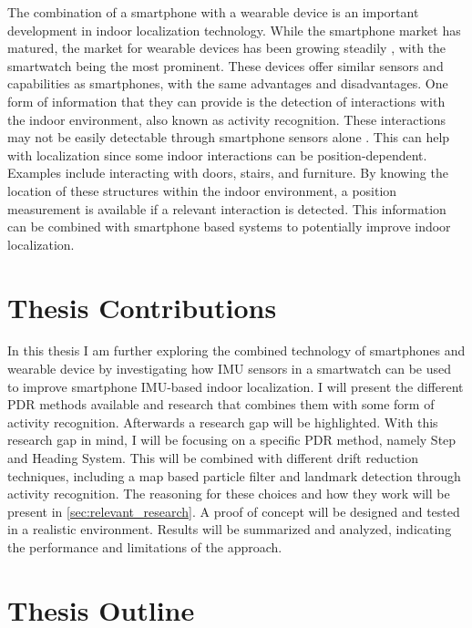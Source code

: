 The combination of a smartphone with a wearable device is an important development in indoor localization technology. While the smartphone market has matured, the market for wearable devices has been growing steadily \cite{jung2016consumer}, with the smartwatch being the most prominent. These devices offer similar sensors and capabilities as smartphones, with the same advantages and disadvantages. One form of information that they can provide is the detection of interactions with the indoor environment, also known as activity recognition. These interactions may not be easily detectable through smartphone sensors alone \cite{Shoaib2015}. This can help with localization since some indoor interactions can be position-dependent. Examples include interacting with doors, stairs, and furniture. By knowing the location of these structures within the indoor environment, a position measurement is available if a relevant interaction is detected. This information can be combined with smartphone based systems to potentially improve indoor localization.

\section{Thesis Contributions}

In this thesis I am further exploring the combined technology of smartphones and wearable device by investigating how IMU sensors in a smartwatch can be used to improve smartphone IMU-based indoor localization. I will present the different \ac{PDR} methods available and research that combines them with some form of activity recognition. Afterwards a research gap will be highlighted. With this research gap in mind, I will be focusing on a specific \ac{PDR} method, namely Step and Heading System. This will be combined with different drift reduction techniques, including a map based particle filter and landmark detection through activity recognition. The reasoning for these choices and how they work will be present in  \cref{sec:relevant_research}. A proof of concept will be designed and tested in a realistic environment. Results will be summarized and analyzed, indicating the performance and  limitations of the approach.

\section{Thesis Outline}

